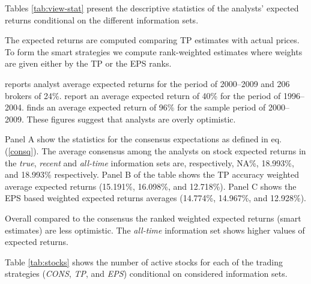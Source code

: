 \documentclass{article}\usepackage[]{graphicx}\usepackage[]{color}
\newcommand{\tr}{\textit{true}}
\newcommand{\naive}{\textit{recent}}
\newcommand{\default}{\textit{all-time}}
\begin{document}
Tables \ref{tab:view-stat} present the descriptive statistics of the analysts' expected returns conditional on the different information sets. 


The expected returns  are computed comparing TP estimates with actual prices. To form the smart strategies we compute rank-weighted estimates where weights are given either by the TP or the EPS ranks. 

\cite{bradshaw2002} reports analyst average expected returns for the period of 2000--2009 and 206 brokers of 24\%. \cite{da2011} report an average expected return of 40\% for the period of 1996--2004. \cite{zhou2013} finds an average expected return of 96\% for the sample period of 2000--2009. These figures suggest that analysts are overly optimistic.

Panel A show the statistics for the consensus expectations as defined in eq. (\ref{consq}). The average consensus among the analysts on stock expected returns in the  \tr{}, \naive{} and \default{} information sets are, respectively, NA\%, 18.993\%, and 18.993\% respectively. Panel B of the table shows the TP accuracy weighted average expected returns (15.191\%, 16.098\%, and 12.718\%). Panel C shows the EPS based weighted expected returns averages (14.774\%, 14.967\%, and 12.928\%). 

Overall compared to the consensus the ranked weighted expected returns (smart estimates) are less optimistic. The \default{} information set shows higher values of expected returns.

Table \ref{tab:stocks} shows the number of active stocks for each of the trading strategies (\textit{CONS}, \textit{TP}, and \textit{EPS}) conditional on considered information sets.
\end{document}
